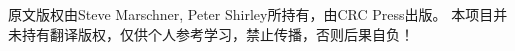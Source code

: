 \thispagestyle{empty}

\maketitle

\newpage
\thispagestyle{empty}

\begin{flushleft}\footnotesize
    原文版权由Steve Marschner, Peter Shirley所持有，由CRC Press出版。
    本项目并未持有翻译版权，仅供个人参考学习，禁止传播，否则后果自负！
\end{flushleft}
